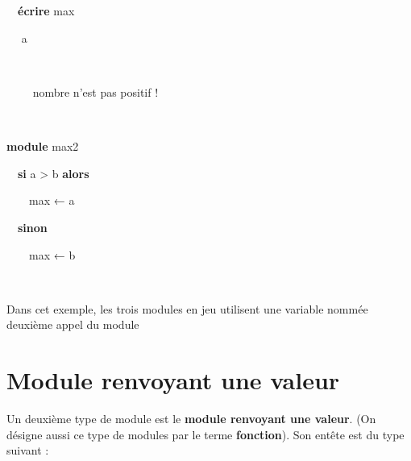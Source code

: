 {\sffamily
{}}

{\sffamily
{}}

{\sffamily
\ \ }

{\sffamily
\ \ }

{\sffamily
\ \ \textbf{écrire} max}

{\sffamily
{}}


\bigskip

{\sffamily
{}}

{\sffamily
\ \  a}

{\sffamily
\ \ }

{\sffamily
\ \ \ \  nombre
n'est pas positif !{\textquotedbl}}

{\sffamily
\ \ }

{\sffamily
{}}


\bigskip

{\sffamily
\textbf{module} max2}

{\sffamily
\ \ \textbf{si} a {\textgreater} b \textbf{alors}}

{\sffamily
\ \ \ \ max{ }{← a}}

{\sffamily
\ \ \textbf{sinon}}

{\sffamily
\ \ \ \ max{ }{← b}}

{\sffamily
\ \  }

{\sffamily
{}}

{
{Dans cet exemple, les trois modules en jeu
utilisent une variable nommée
}deuxième{ appel du module
}}

\section[Module renvoyant une valeur]{\bfseries Module renvoyant une
valeur}
{
{Un deuxième type de module est le
}{\textbf{module renvoyant une
valeur}}{. (On désigne aussi ce type de modules
par le terme
}{\textbf{fonction}}{).
Son entête est du type suivant :}}

